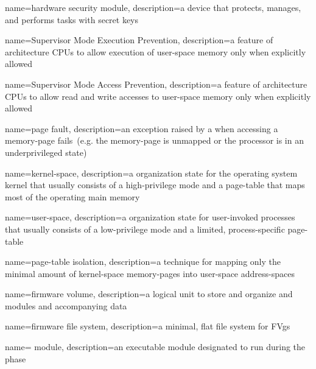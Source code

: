 {
  name={hardware security module},
  description={a device that protects, manages, and performs tasks with secret keys}
}

{
  name={Supervisor Mode Execution Prevention},
  description={a feature of  architecture \glspl{CPU} to allow execution of \gls{user-space} memory only when explicitly allowed}
}

{
  name={Supervisor Mode Access Prevention},
  description={a feature of  architecture \glspl{CPU} to allow read and write accesses to \gls{user-space} memory only when explicitly allowed}
}

{
  name={page fault},
  description={an exception raised by a  when accessing a \gls{memory-page} fails~(e.g. the \gls{memory-page} is unmapped or the processor is in an underprivileged state)}
}

{
  name={kernel-space},
  description={a  organization state for the operating system kernel that usually consists of a high-privilege  mode and a \gls{page-table} that maps most of the operating main memory}
}

{
  name={user-space},
  description={a  organization state for user-invoked processes that usually consists of a low-privilege  mode and a limited, process-specific \gls{page-table}}
}

{
  name={\gls{page-table} isolation},
  description={a technique for mapping only the minimal amount of \gls{kernel-space} \glspl{memory-page} into \gls{user-space} \glspl{address-space}}
}

{
  name={firmware volume},
  description={a logical unit to store and organize  and  modules and accompanying data}
}

{
  name={firmware file system},
  description={a minimal, flat file system for \glspl{FVg}}
}

{
  name={ module},
  description={an executable module designated to run during the   phase}
}

